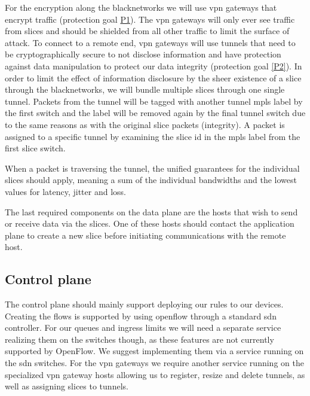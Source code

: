 For the encryption along the \gls{blacknetwork}s we will use \acrshort{vpn} gateways that encrypt traffic (protection goal \hyperref[P1]{P1}). The \acrshort{vpn} gateways will only ever see traffic from slices and should be shielded from all other traffic to limit the surface of attack. To connect to a remote end, \acrshort{vpn} gateways will use tunnels that need to be cryptographically secure to not disclose information and have protection against data manipulation to protect our data integrity (protection goal \ref{P2}). In order to limit the effect of information disclosure by the sheer existence of a slice through the \gls{blacknetwork}s, we will bundle multiple slices through one single tunnel. Packets from the tunnel will be tagged with another tunnel \acrshort{mpls} label by the first switch and the label will be removed again by the final tunnel switch due to the same reasons as with the original slice packets (integrity). A packet is assigned to a specific tunnel by examining the slice id in the \acrshort{mpls} label from the first slice switch.


When a packet is traversing the tunnel, the unified guarantees for the individual slices should apply, meaning a sum of the individual \gls{bandwidth}s and the lowest values for \gls{latency}, \gls{jitter} and loss.

The last required components on the data plane are the hosts that wish to send or receive data via the slices. One of these hosts should contact the application plane to create a new slice before initiating communications with the remote host.

\subsection{Control plane}
The control plane should mainly support deploying our rules to our devices. Creating the flows is supported by using \Gls{openflow} through a standard \acrshort{sdn} controller. For our queues and ingress limits we will need a separate service realizing them on the switches though, as these features are not currently supported by OpenFlow. We suggest implementing them via a service running on the \acrshort{sdn} switches. For the \acrshort{vpn} gateways we require another service running on the specialized \acrshort{vpn} gateway hosts allowing us to register, resize and delete tunnels, as well as assigning slices to tunnels.

